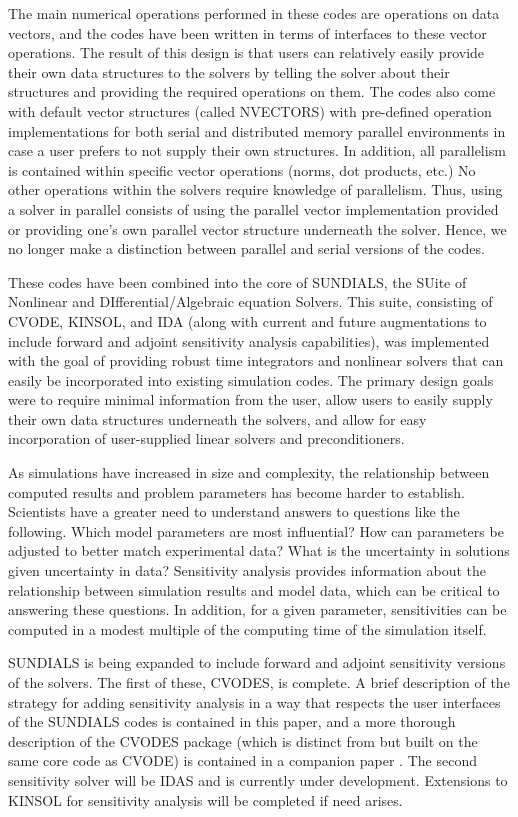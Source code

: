 The main numerical operations performed in these codes are
operations on data vectors, and the codes have been written in
terms of interfaces to these vector operations.  The result of
this design is that users can relatively easily provide their own
data structures to the solvers by telling the solver about their
structures and providing the required operations on them. The
codes also come with default vector structures (called NVECTORS)
with pre-defined operation implementations for both serial and
distributed memory parallel environments in case a user prefers to
not supply their own structures. In addition, all parallelism is
contained within specific vector operations (norms, dot products,
etc.)  No other operations within the solvers require knowledge of
parallelism. Thus, using a solver in parallel consists of using
the parallel vector implementation provided or providing one's own
parallel vector structure underneath the solver.  Hence, we no
longer make a distinction between parallel and serial versions of
the codes.

These codes have been combined into the core of SUNDIALS, the
SUite of Nonlinear and DIfferential/Algebraic equation Solvers.
This suite, consisting of CVODE, KINSOL, and IDA (along with
current and future augmentations to include forward and adjoint
sensitivity analysis capabilities), was implemented with the goal
of providing robust time integrators and nonlinear solvers that
can easily be incorporated into existing simulation codes.  The
primary design goals were to require minimal information from the
user, allow users to easily supply their own data structures
underneath the solvers, and allow for easy incorporation of
user-supplied linear solvers and preconditioners.

As simulations have increased in size and complexity, the
relationship between computed results and problem parameters has
become harder to establish.  Scientists have a greater need to
understand answers to questions like the following.  Which model
parameters are most influential? How can parameters be adjusted to
better match experimental data? What is the uncertainty in
solutions given uncertainty in data?  Sensitivity analysis
provides information about the relationship between simulation
results and model data, which can be critical to answering these
questions. In addition, for a given parameter, sensitivities can
be computed in a modest multiple of the computing time of the
simulation itself.

SUNDIALS is being expanded to include forward and adjoint
sensitivity versions of the solvers. The first of these, CVODES,
is complete.  A brief description of the strategy for adding
sensitivity analysis in a way that respects the user interfaces of
the SUNDIALS codes is contained in this paper, and a more thorough
description of the CVODES package (which is distinct from but
built on the same core code as CVODE) is contained in a companion
paper \cite{SeHi:03}. The second sensitivity solver will be IDAS
and is currently under development. Extensions to KINSOL for
sensitivity analysis will be completed if need arises.

